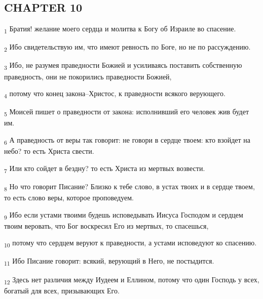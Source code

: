 \subsection{CHAPTER 10}
\begin{tcolorbox}
\textsubscript{1} Братия! желание моего сердца и молитва к Богу об Израиле во спасение.
\end{tcolorbox}
\begin{tcolorbox}
\textsubscript{2} Ибо свидетельствую им, что имеют ревность по Боге, но не по рассуждению.
\end{tcolorbox}
\begin{tcolorbox}
\textsubscript{3} Ибо, не разумея праведности Божией и усиливаясь поставить собственную праведность, они не покорились праведности Божией,
\end{tcolorbox}
\begin{tcolorbox}
\textsubscript{4} потому что конец закона--Христос, к праведности всякого верующего.
\end{tcolorbox}
\begin{tcolorbox}
\textsubscript{5} Моисей пишет о праведности от закона: исполнивший его человек жив будет им.
\end{tcolorbox}
\begin{tcolorbox}
\textsubscript{6} А праведность от веры так говорит: не говори в сердце твоем: кто взойдет на небо? то есть Христа свести.
\end{tcolorbox}
\begin{tcolorbox}
\textsubscript{7} Или кто сойдет в бездну? то есть Христа из мертвых возвести.
\end{tcolorbox}
\begin{tcolorbox}
\textsubscript{8} Но что говорит Писание? Близко к тебе слово, в устах твоих и в сердце твоем, то есть слово веры, которое проповедуем.
\end{tcolorbox}
\begin{tcolorbox}
\textsubscript{9} Ибо если устами твоими будешь исповедывать Иисуса Господом и сердцем твоим веровать, что Бог воскресил Его из мертвых, то спасешься,
\end{tcolorbox}
\begin{tcolorbox}
\textsubscript{10} потому что сердцем веруют к праведности, а устами исповедуют ко спасению.
\end{tcolorbox}
\begin{tcolorbox}
\textsubscript{11} Ибо Писание говорит: всякий, верующий в Него, не постыдится.
\end{tcolorbox}
\begin{tcolorbox}
\textsubscript{12} Здесь нет различия между Иудеем и Еллином, потому что один Господь у всех, богатый для всех, призывающих Его.
\end{tcolorbox}
